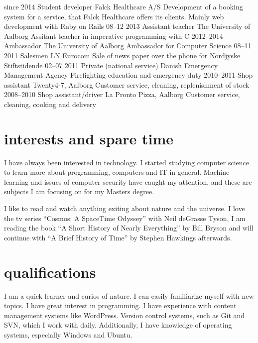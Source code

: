 \documentclass[print]{friggeri-cv}
\begin{document}
\begin{entrylist}
  \entry
    {since 2014}
    {Student developer}
    {Falck Healthcare A/S}
    {Development of a booking system for a service, that Falck Healthcare offers its clients. Mainly web development with Ruby on Rails}
  \entry
    {08–12 2013}
    {Assistant teacher}
    {The University of Aalborg}
    {Assitant teacher in imperative programming with C}
  \entry
    {2012–2014}
    {Ambassador}
    {The University of Aalborg}
    {Ambassador for Computer Science}
  \entry
    {08–11 2011}
    {Salesmen}
    {LN Eurocom}
    {Sale of news paper over the phone for Nordjyske Stiftstidende}
  \entry
    {02–07 2011}
    {Private (national service)}
    {Danish Emergency Management Agency}
    {Firefighting education and emergency duty}
  \entry
    {2010–2011}
    {Shop assistant}
    {Twenty4-7, Aalborg}
    {Customer service, cleaning, replenishment of stock}
  \entry
    {2008–2010}
    {Shop assistant/driver}
    {La Pronto Pizza, Aalborg}
    {Customer service, cleaning, cooking and delivery}
\end{entrylist}

\section{interests and spare time}
I have always been interested in technology. I started studying computer science to learn more about programming, computers and IT in general. Machine learning and issues of computer security have caught my attention, and these are subjects I am focusing on for my Masters degree.

I like to read and watch anything exiting about nature and the universe. I love the tv series ``Cosmos: A SpaceTime Odyssey'' with Neil deGrasse Tyson, I am reading the book ``A Short History of Nearly Everything'' by Bill Bryson and will continue with ``A Brief History of Time'' by Stephen Hawkings afterwards.

\section{qualifications}

I am a quick learner and curios of nature. I can easily familiarize myself with new topics. I have great interest in programming. I have experience with content management systems like WordPress. Version control systems, such as Git and SVN, which I work with daily. Additionally, I have knowledge of operating systems, especially Windows and Ubuntu.
\end{document}
